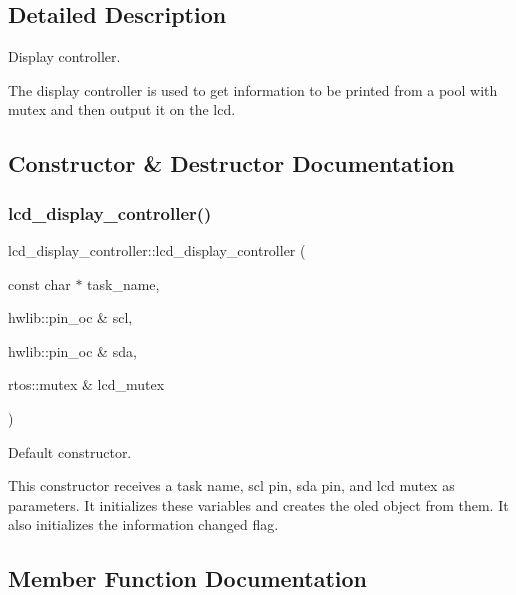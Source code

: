 \subsection{Detailed Description}
Display controller. 

The display controller is used to get information to be printed from a pool with mutex and then output it on the lcd. 

\subsection{Constructor \& Destructor Documentation}
\hypertarget{classlcd__display__controller_abf42bfd4d932278f5777df103c3fd27f}{}\label{classlcd__display__controller_abf42bfd4d932278f5777df103c3fd27f} 
\subsubsection{\texorpdfstring{lcd\+\_\+display\+\_\+controller()}{lcd\_display\_controller()}}
{\footnotesize\ttfamily lcd\+\_\+display\+\_\+controller\+::lcd\+\_\+display\+\_\+controller (\begin{DoxyParamCaption}\item[{const char $\ast$}]{task\+\_\+name,  }\item[{hwlib\+::pin\+\_\+oc \&}]{scl,  }\item[{hwlib\+::pin\+\_\+oc \&}]{sda,  }\item[{rtos\+::mutex \&}]{lcd\+\_\+mutex }\end{DoxyParamCaption})\hspace{0.3cm}{\ttfamily [inline]}}



Default constructor. 

This constructor receives a task name, scl pin, sda pin, and lcd mutex as parameters. It initializes these variables and creates the oled object from them. It also initializes the information changed flag. 

\subsection{Member Function Documentation}
\hypertarget{classlcd__display__controller_af37be06c27c0eb1e67dbeb8e8e2df8c1}{}\label{classlcd__display__controller_af37be06c27c0eb1e67dbeb8e8e2df8c1} 
